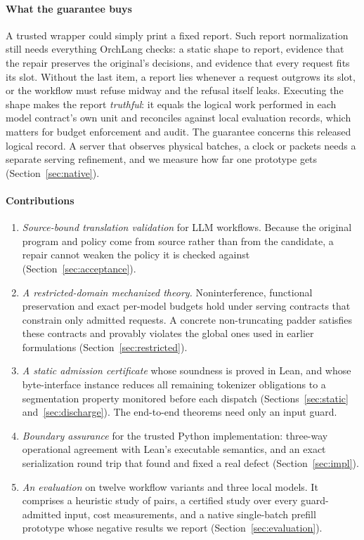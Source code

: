 \documentclass[preprint,12pt]{elsarticle}
\theoremstyle{definition}
\begin{document}
\paragraph{What the guarantee buys}
A trusted wrapper could simply print a fixed report. Such report normalization
still needs everything OrchLang checks: a static shape to report, evidence that
the repair preserves the original's decisions, and evidence that every request
fits its slot. Without the last item, a report lies whenever a request outgrows
its slot, or the workflow must refuse midway and the refusal itself leaks.
Executing the shape makes the report \emph{truthful}: it equals the logical work
performed in each model contract's own unit and reconciles against local
evaluation records, which matters for budget enforcement and audit. The
guarantee concerns this released logical record. A server that observes physical
batches, a clock or packets needs a separate serving refinement, and we measure
how far one prototype gets (Section~\ref{sec:native}).

\paragraph{Contributions}
\begin{enumerate}
\item \emph{Source-bound translation validation} for LLM workflows. Because the
original program and policy come from source rather than from the candidate, a
repair cannot weaken the policy it is checked against
(Section~\ref{sec:acceptance}).
\item \emph{A restricted-domain mechanized theory.} Noninterference, functional
preservation and exact per-model budgets hold under serving contracts that
constrain only admitted requests. A concrete non-truncating padder satisfies
these contracts and provably violates the global ones used in earlier
formulations (Section~\ref{sec:restricted}).
\item \emph{A static admission certificate} whose soundness is proved in Lean, and
whose byte-interface instance reduces all remaining tokenizer obligations to a
segmentation property monitored before each dispatch (Sections~\ref{sec:static}
and~\ref{sec:discharge}). The end-to-end theorems need only an input guard.
\item \emph{Boundary assurance} for the trusted Python implementation: three-way
operational agreement with Lean's executable semantics, and an exact
serialization round trip that found and fixed a real defect
(Section~\ref{sec:impl}).
\item \emph{An evaluation} on twelve workflow variants and three local models. It
comprises a heuristic study of \roundTwoPairs{} pairs, a certified study over every
guard-admitted input, cost measurements, and a native single-batch prefill
prototype whose negative results we report (Section~\ref{sec:evaluation}).
\end{enumerate}
\end{document}
